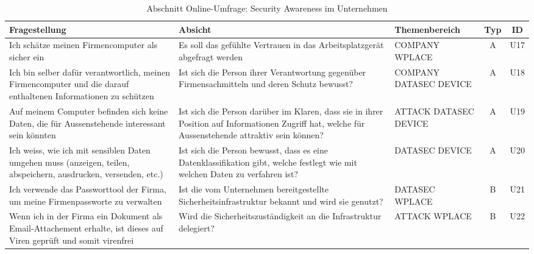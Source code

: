 \documentclass[../../main.tex]{subfiles}
\begin{document}
\begin{table}[H]
\tablefontsize	
\centering
\caption{Abschnitt Online-Umfrage: Security Awareness im Unternehmen}
\label{Security Awareness im Unternehmen}
\begin{tabular}{ |p{5.5cm}|p{5.5cm}|p{2.5cm}|c|c|}

\hline
\tableheaderbgcolor
\textbf{Fragestellung} & \textbf{Absicht} & \textbf{Themenbereich} & \textbf{Typ} & \textbf{ID}\\ 
\hline
Ich schätze meinen Firmencomputer \newline als sicher ein & Es soll das gefühlte Vertrauen in das Arbeitsplatzgerät abgefragt werden & COMPANY \newline WPLACE & A & U17 \\
\hline

Ich bin selber dafür verantwortlich, meinen Firmencomputer und die darauf enthaltenen Informationen zu schützen & Ist sich die Person ihrer Verantwortung gegenüber Firmensachmitteln und deren Schutz bewusst? & COMPANY \newline DATASEC \newline DEVICE & A & U18 \\
\hline

Auf meinem Computer befinden sich keine Daten, die für Aussenstehende interessant sein könnten & Ist sich die Person darüber im Klaren, dass sie in ihrer Position auf Informationen Zugriff hat, welche für Aussenstehende attraktiv sein können? & ATTACK \newline DATASEC \newline DEVICE & A & U19 \\
\hline

Ich weiss, wie ich mit sensiblen Daten umgehen muss (anzeigen, teilen, abspeichern, ausdrucken, versenden, etc.) & Ist sich die Person bewusst, dass es eine Datenklassifikation gibt, welche festlegt wie mit welchen Daten zu verfahren ist? & DATASEC \newline DEVICE & A & U20 \\
\hline

Ich verwende das Passworttool der Firma, um meine Firmenpassworte zu verwalten & Ist die vom Unternehmen bereitgestellte Sicherheitsinfrastruktur bekannt und wird sie genutzt? & DATASEC \newline WPLACE & B & U21 \\
\hline

Wenn ich in der Firma ein Dokument als Email-Attachement erhalte, ist dieses auf Viren geprüft und somit virenfrei & Wird die Sicherheitszuständigkeit an die Infrastruktur delegiert? & ATTACK \newline WPLACE & B & U22 \\
\hline


\end{tabular}
\end{table}
\end{document}
